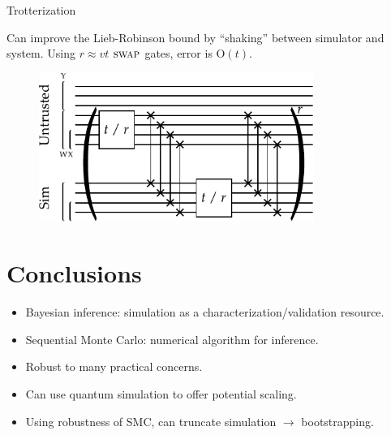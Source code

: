 \documentclass[xcolor=dvipsnames, compress]{beamer}
\newcommand{\OO}{\mathrm{O}}
\newcommand{\swapgt}{\textsc{swap}}
\begin{document}
\begin{frame}{Trotterization}

  Can improve the Lieb-Robinson bound by ``shaking'' between simulator
  and system. Using $r \approx vt$ $\swapgt$ gates, error is $\OO(t)$.

  \begin{figure}
    \centering
    \includegraphics[width=0.8\textwidth]{shaking}
  \end{figure}

\end{frame}

\section{Conclusions}


\begin{frame}{}

  \begin{itemize}
   \item<+-> Bayesian inference: simulation as a characterization/validation resource.
   \item<+-> Sequential Monte Carlo: numerical algorithm for inference.
   \item<+-> Robust to many practical concerns.
   \item<+-> Can use quantum simulation to offer potential scaling.
   \item<+-> Using robustness of SMC, can truncate simulation $\to$ bootstrapping.
  \end{itemize}

\end{frame}
\end{document}
